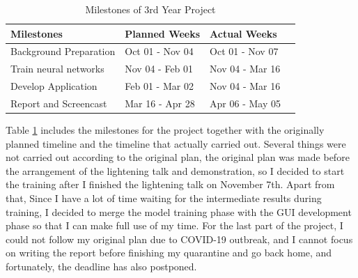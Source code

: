 \begin{table}
    \begin{center}
    \begin{tabular}{|l|l|l|l|}\hline\hline
    Milestones&Planned Weeks&Actual Weeks\\
    \hline
    Background Preparation&Oct 01 - Nov 04&Oct 01 - Nov 07\\
    Train neural networks&Nov 04 - Feb 01&Nov 04 - Mar 16\\
    Develop Application&Feb 01 - Mar 02&Nov 04 - Mar 16\\
    Report and Screencast&Mar 16 - Apr 28&Apr 06 - May 05\\
    \hline\hline
    \end{tabular}
    \end{center}
    \caption{Milestones of 3rd Year Project}
    \label{milestones table}
\end{table}

Table \ref{milestones table} includes the milestones for the project together with 
the originally planned timeline and the timeline that actually carried out. Several things 
were not carried out according to the original plan, the original plan was made 
before the arrangement of the lightening talk and demonstration, so I decided to start 
the training after I finished the lightening talk on November 7th. Apart from that, 
Since I have a lot of time waiting for the intermediate results during training, I decided
to merge the model training phase with the GUI development phase so that I can make 
full use of my time. For the last part of the project, I could not follow my original 
plan due to COVID-19 outbreak, and I cannot focus on writing the report before finishing
my quarantine and go back home, and fortunately, the deadline has also postponed.

